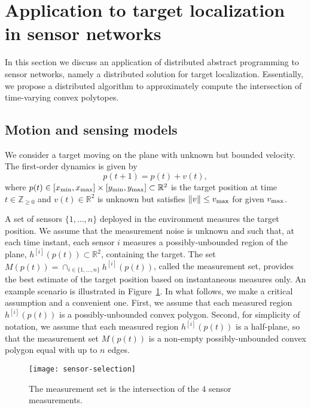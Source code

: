 \documentclass[onecolumn,journal,letterpaper]{IEEEtran}
\newcommand{\integernonnegative}{{\mathbb{Z}_{\geq0}}}
\newcommand{\naturalzero}{\mathbb{N}_0}
\renewcommand{\naturalzero}{\integernonnegative}
\newcommand{\real}{{\mathbb{R}}}
\newcommand{\subscr}[2]{{#1}_{\textup{#2}}}
\newcommand{\norm}[1]{\|#1\|}
\newcommand{\xmin}{\subscr{x}{min}}
\newcommand{\xmax}{\subscr{x}{max}}
\newcommand{\ymin}{\subscr{y}{min}}
\newcommand{\ymax}{\subscr{y}{max}}
\newcommand{\until}[1]{\{1,\dots,#1\}}
\newcommand{\supind}[2]{{#1}^{[#2]}}
\begin{document}
\section{Application to target localization in sensor networks}
\label{sec:target-localization}
In this section we discuss an application of distributed abstract
programming to sensor networks, namely a distributed solution for target
localization.  Essentially, we propose a distributed algorithm to
approximately compute the intersection of time-varying convex polytopes.



\subsection{Motion and sensing models}
We consider a target moving on the plane with unknown but bounded
velocity. The first-order dynamics is given by
\begin{equation}  \label{eq:target_dyn}
  p(t + 1) = p(t) + v(t),
\end{equation}
where $p(t)\in{[\xmin,\xmax]\times[\ymin,\ymax]}\subset\real^2$ is the
target position at time $t\in\naturalzero$ and $v(t)\in\real^2$ is unknown
but satisfies $\norm{v}{}\leq \subscr{v}{max}$ for given $\subscr{v}{max}$.

A set of sensors $\until{n}$ deployed in the environment measures the
target position. We assume that the measurement noise is unknown and such
that, at each time instant, each sensor $i$ measures a possibly-unbounded
region of the plane, $\supind{h}{i}(p(t)) \subset \real^2$, containing the
target. The set $M(p(t)) =
{\ensuremath{\operatorname{\cap}}}_{i\in\until{n}} \supind{h}{i}(p(t))$,
called the measurement set, provides the best estimate of the target
position based on instantaneous measures only.  An example scenario is
illustrated in Figure~\ref{fig:target-localization-scen}.  In what follows,
we make a critical assumption and a convenient one. First, we assume that
each measured region $\supind{h}{i}(p(t))$ is a possibly-unbounded convex
polygon. Second, for simplicity of notation, we assume that each measured
region $\supind{h}{i}(p(t))$ is a half-plane, so that the measurement set
$M(p(t))$ is a non-empty possibly-unbounded convex polygon equal with up to
$n$ edges.
\begin{figure}[h]
  \begin{center}
\texttt{[image: sensor-selection]}\caption{The measurement set is the intersection of the $4$ sensor
      measurements.}
    \label{fig:target-localization-scen}
  \end{center}
\end{figure}
\end{document}
